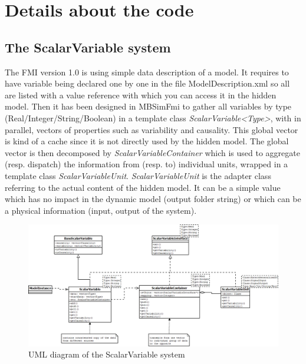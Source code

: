 \documentclass[10pt,a4paper]{report}
\begin{document}
\section{Details about the code}
%
\subsection*{The ScalarVariable system}
The FMI version 1.0 is using simple data description of a model. It requires to have variable being declared one by one in the file ModelDescription.xml so all are listed with a value reference with which you can access it in the hidden model. Then it has been designed in MBSimFmi to gather all variables by type (Real/Integer/String/Boolean) in a template class \emph{ScalarVariable<Type>}, with in parallel, vectors of properties such as variability and causality. This global vector is kind of a cache since it is not directly used by the hidden model. The global vector is then decomposed by \emph{ScalarVariableContainer} which is used to aggregate (resp. dispatch) the information from (resp. to) individual units, wrapped in a template class \emph{ScalarVariableUnit}. \emph{ScalarVariableUnit} is the adapter class referring to the actual content of the hidden model. It can be a simple value which has no impact in the dynamic model (output folder string) or which can be a physical information (input, output of the system).
%
\begin{figure}[h]
	\centering
	\includegraphics[width=\textwidth]{scalarvar}
	\caption{UML diagram of the ScalarVariable system}
	\label{fig:umlSV}
\end{figure}
%
\end{document}
